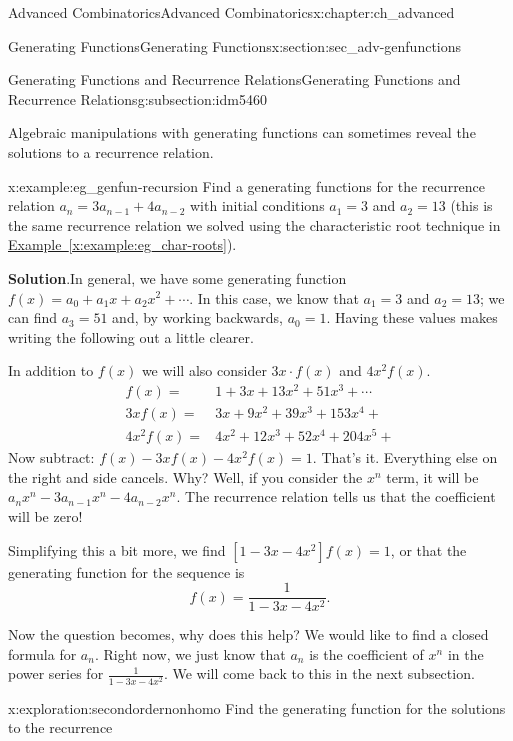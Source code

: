 \documentclass[oneside,10pt,]{book}
\numberwithin{equation}{chapter}
\newcommand{\amp}{&}
\begin{document}
\begin{chapterptx}{Advanced Combinatorics}{}{Advanced Combinatorics}{}{}{x:chapter:ch_advanced}
\begin{sectionptx}{Generating Functions}{}{Generating Functions}{}{}{x:section:sec_adv-genfunctions}
\begin{subsectionptx}{Generating Functions and Recurrence Relations}{}{Generating Functions and Recurrence Relations}{}{}{g:subsection:idm5460}
\par
Algebraic manipulations with generating functions can sometimes reveal the solutions to a recurrence relation.%
\begin{example}{}{x:example:eg_genfun-recursion}%
Find a generating functions for the recurrence relation \(a_n = 3a_{n-1} + 4a_{n-2}\) with initial conditions \(a_1 = 3\) and \(a_2 = 13\) (this is the same recurrence relation we solved using the characteristic root technique in \hyperref[x:example:eg_char-roots]{Example~\ref{x:example:eg_char-roots}}).%
\par\smallskip%
\noindent\textbf{Solution}.\hypertarget{g:solution:idm5476}{}\quad{}In general, we have some generating function \(f(x) = a_0 + a_1x + a_2x^2 + \cdots\).  In this case, we know that \(a_1 = 3\) and \(a_2 = 13\); we can find \(a_3 = 51\) and, by working backwards, \(a_0 = 1\).  Having these values makes writing the following out a little clearer.%
\par
In addition to \(f(x)\) we will also consider \(3x\cdot f(x)\) and \(4x^2 f(x)\).%
\begin{align*}
f(x) = \amp 1 + 3x + 13x^2 + 51 x^3 + \cdots \\
3x f(x) = \amp 3x + 9x^2 + 39x^3 + 153 x^4 +  \\
4x^2 f(x) = \amp 4x^2 + 12x^3 + 52x^4 + 204 x^5 +  
\end{align*}
Now subtract: \(f(x) - 3xf(x) - 4x^2f(x) = 1\).  That's it.  Everything else on the right and side cancels.  Why?  Well, if you consider the \(x^n\) term, it will be \(a_n x^n - 3a_{n-1}x^n - 4a_{n-2}x^n\).  The recurrence relation tells us that the coefficient will be zero!%
\par
Simplifying this a bit more, we find \([1- 3x - 4x^2]f(x) = 1\), or that the generating function for the sequence is%
\begin{equation*}
f(x) = \frac{1}{1-3x-4x^2}\text{.}
\end{equation*}
%
\par
Now the question becomes, why does this help?  We would like to find a closed formula for \(a_n\).  Right now, we just know that \(a_n\) is the coefficient of \(x^n\) in the power series for \(\frac{1}{1-3x-4x^2}\).  We will come back to this in the next subsection.%
\end{example}
\begin{exploration}{}{x:exploration:secondordernonhomo}%
Find the generating function for the solutions to the recurrence%
\begin{equation*}

\end{equation*}
\end{exploration}
\end{subsectionptx}
\end{sectionptx}
\end{chapterptx}
\end{document}

